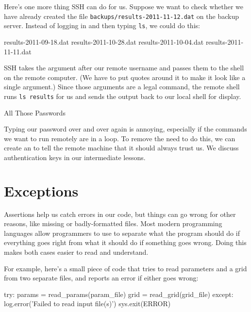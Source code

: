 Here's one more thing SSH can do for us. Suppose we want to check
whether we have already created the file
\texttt{backups/results-2011-11-12.dat} on the backup server. Instead of
logging in and then typing \texttt{ls}, we could do this:


\begin{VerbOut}
results-2011-09-18.dat  results-2011-10-28.dat
results-2011-10-04.dat  results-2011-11-11.dat
\end{VerbOut}

SSH takes the argument after our remote username and passes them to the
shell on the remote computer. (We have to put quotes around it to make
it look like a single argument.) Since those arguments are a legal
command, the remote shell runs \texttt{ls results} for us and sends the
output back to our local shell for display.

\begin{swcbox}{All Those Passwords}

Typing our password over and over again is annoying, especially if the
commands we want to run remotely are in a loop. To remove the need to do
this, we can create an  to tell the remote machine that it should always trust us. We
discuss authentication keys in our intermediate lessons.

\end{swcbox}

\section{Exceptions}

Assertions help us catch errors in our code, but things can go wrong for
other reasons, like missing or badly-formatted files. Most modern
programming languages allow programmers to use
 to separate what the program should
do if everything goes right from what it should do if something goes
wrong. Doing this makes both cases easier to read and understand.

For example, here's a small piece of code that tries to read parameters
and a grid from two separate files, and reports an error if either goes
wrong:

\begin{VerbIn}
try:
    params = read_params(param_file)
    grid = read_grid(grid_file)
except:
    log.error('Failed to read input file(s)')
    sys.exit(ERROR)
\end{VerbIn}

